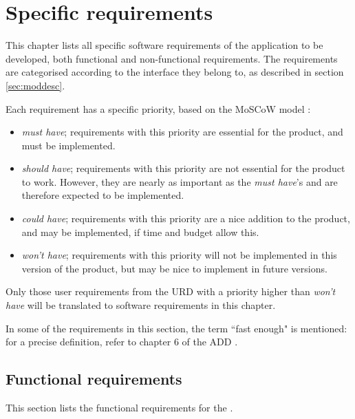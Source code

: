\chapter{Specific requirements}
\label{chap:specreq}
This chapter lists all specific software requirements of the application to be developed, both functional and non-functional requirements. The requirements are categorised according to the interface they belong to, as described in section \ref{sec:moddesc}.

Each requirement has a specific priority, based on the MoSCoW model \cite{moscow}:

\begin{itemize}
    \item \emph{must have}; requirements with this priority are essential for the product, and must be implemented.
    \item \emph{should have}; requirements with this priority are not essential for the product to work. However, they are nearly as important as the \emph{must have}'s and are therefore expected to be implemented.
    \item \emph{could have}; requirements with this priority are a nice addition to the product, and may be implemented, if time and budget allow this.
    \item \emph{won't have}; requirements with this priority will not be implemented in this version of the product, but may be nice to implement in future versions.
\end{itemize}

\noindent Only those user requirements from the URD \cite{urd} with a priority higher than \emph{won't have} will be translated to software requirements in this chapter.

\fpstartparagraph{} In some of the requirements in this section, the term ``fast enough" is mentioned: for a precise definition, refer to chapter 6 of the ADD \cite{add}.


\section{Functional requirements}
\label{sec:funcreq}
This section lists the functional requirements for the \applicationname.

